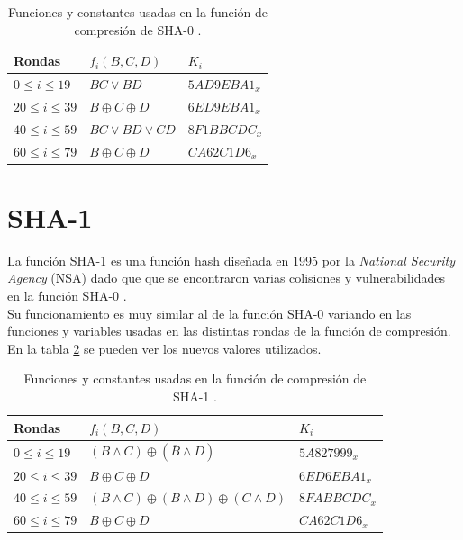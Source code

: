 \begin{table}[H]
	\begin{center}
		\begin{tabular}{| l | l | l |}
				\hline
				Rondas & $f_i(B,C,D)$ & $K_i$\\ \hline
				$0\leq i\leq 19$ & $BC\vee BD$ & $5AD9EBA1_x$\\ \hline
				$20\leq i\leq 39$ & $B\oplus C\oplus D$ & $6ED9EBA1_x$\\ \hline
				$40\leq i\leq 59$ & $BC\vee BD\vee CD$ & $8F1BBCDC_x$\\ \hline
				$60\leq i\leq 79$ & $B\oplus C\oplus D$ & $CA62C1D6_x$\\ \hline
		\end{tabular}
		\caption{Funciones y constantes usadas en la función de compresión de SHA-0 \cite{sha0}.}
	\label{tablasha0}
	\end{center}
\end{table}

\section{SHA-1}
La función SHA-1 es una función hash diseñada en 1995 por la \emph{National Security Agency} (NSA) dado que que se encontraron varias colisiones y vulnerabilidades en la función SHA-0 \cite{Penard2008}.\\
Su funcionamiento es muy similar al de la función SHA-0 variando en las funciones y variables usadas en las distintas rondas de la función de compresión. En la tabla \ref{tablasha1} se pueden ver los nuevos valores utilizados.\\
\begin{table}[htb]
	\begin{center}
		\begin{tabular}{| l | l | l |}
				\hline
				Rondas & $f_i(B,C,D)$ & $K_i$\\ \hline
				$0\leq i\leq 19$ & $(B\wedge C)\oplus (\overline{B}\wedge D)$ & $5A827999_x$\\ \hline
				$20\leq i\leq 39$ & $B\oplus C\oplus D$ & $6ED6EBA1_x$\\ \hline
				$40\leq i\leq 59$ & $(B\wedge C)\oplus (B\wedge D) \oplus (C\wedge D)$ & $8FABBCDC_x$\\ \hline
				$60\leq i\leq 79$ & $B\oplus C\oplus D$ & $CA62C1D6_x$\\ \hline
		\end{tabular}
		\caption{Funciones y constantes usadas en la función de compresión de SHA-1 \cite{sha1}.}
		\label{tablasha1}
	\end{center}
\end{table}

